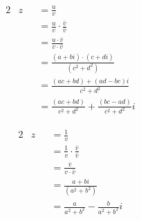 \noindent
\begin{minipage}{0.4\linewidth}
    \parbox[t]{0.35\linewidth}
    {
        \begin{alignat*}{2}
            & z &&= \frac{u}{v} \\
            & &&= \frac{u}{v} \cdot \frac{\bar{v}}{\bar{v}} \\
            & &&= \frac{u \cdot \bar{v}}{v \cdot \bar{v}} \\
            & &&= \frac{(a + bi) \cdot (c + di)}{(c^2 + d^2)} \\
            & &&= \frac{(ac + bd) + (ad - bc)i}{c^2 + d^2} \\
            & &&= \frac{(ac + bd)}{c^2 + d^2} + \frac{(bc - ad)}{c^2 + d^2}i
        \end{alignat*}
    }
\end{minipage}
\begin{minipage}{0.4\linewidth}
    \noindent
    \parbox[t]{0.35\linewidth}
    {
        \begin{alignat*}{2}
            & z &&= \frac{1}{v} \\
            & &&= \frac{1}{v} \cdot \frac{\bar{v}}{\bar{v}} \\
            & &&= \frac{\bar{v}}{v \cdot \bar{v}} \\
            & &&= \frac{a + bi}{(a^2 + b^2)} \\
            & &&= \frac{a}{a^2 + b^2} - \frac{b}{a^2 + b^2}i
        \end{alignat*}
    }
\end{minipage}